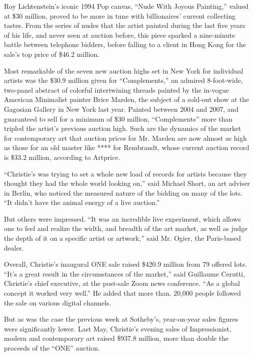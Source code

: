 Roy Lichtenstein's iconic 1994 Pop canvas, ``Nude With Joyous
Painting,'' valued at \$30 million, proved to be more in tune with
billionaires' current collecting tastes. From the series of nudes that
the artist painted during the last five years of his life, and never
seen at auction before, this piece sparked a nine-minute battle between
telephone bidders, before falling to a client in Hong Kong for the
sale's top price of \$46.2 million.

Most remarkable of the seven new auction highs set in New York for
individual artists was the \$30.9 million given for ``Complements,'' an
admired 8-foot-wide, two-panel abstract of colorful intertwining threads
painted by the in-vogue American Minimalist painter Brice Marden, the
subject of a sold-out show at the Gagosian Gallery in New York last
year. Painted between 2004 and 2007, and guaranteed to sell for a
minimum of \$30 million, ``Complements'' more than tripled the artist's
previous auction high. Such are the dynamics of the market for
contemporary art that auction prices for Mr. Marden are now almost as
high as those for an old master like **** for Rembrandt, whose current
auction record is \$33.2 million, according to Artprice.

``Christie's was trying to set a whole new load of records for artists
because they thought they had the whole world looking on,'' said Michael
Short, an art adviser in Berlin, who noticed the measured nature of the
bidding on many of the lots. ``It didn't have the animal energy of a
live auction.''

But others were impressed. ``It was an incredible live experiment, which
allows one to feel and realize the width, and breadth of the art market,
as well as judge the depth of it on a specific artist or artwork,'' said
Mr. Ogier, the Paris-based dealer.

Overall, Christie's inaugural ONE sale raised \$420.9 million from 79
offered lots. ``It's a great result in the circumstances of the
market,'' said Guillaume Cerutti, Christie's chief executive, at the
post-sale Zoom news conference. ``As a global concept it worked very
well.'' He added that more than. 20,000 people followed the sale on
various digital channels.

But as was the case the previous week at Sotheby's, year-on-year sales
figures were significantly lower. Last May, Christie's evening sales of
Impressionist, modern and contemporary art raised \$937.8 million, more
than double the proceeds of the ``ONE'' auction.

